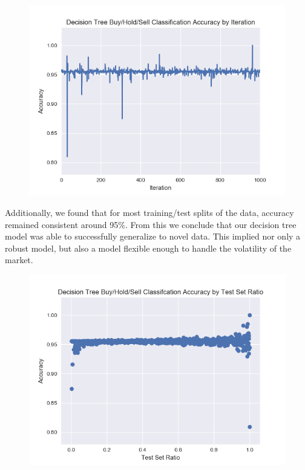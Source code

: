 \documentclass{article}
\begin{document}
\begin{figure}[H]
	\includegraphics[scale=0.55 ]{../pic/iteration.png}
\end{figure}

Additionally, we found that for most training/test splits of the data, accuracy remained consistent around 95\%. From this we conclude that our decision tree model was able to successfully generalize to novel data. This implied nor only a robust model, but also a model flexible enough to handle the volatility of the market. \\

\begin{figure}[H]
	\includegraphics[scale=0.55 ]{../pic/ration.png}
\end{figure}
\end{document}
